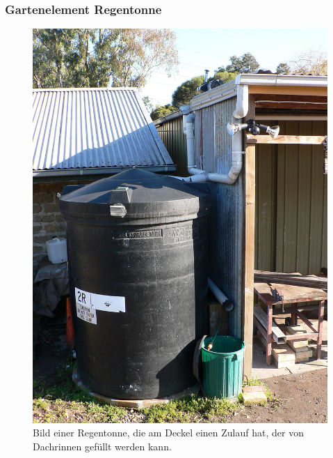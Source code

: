 \subsubsection{Gartenelement Regentonne}
\begin{figure}[!htb]
	\centering
	\includegraphics[height=0.4\textheight]{images/Regentonne.jpg}
	\caption[Bild einer Regentonne, die am Deckel einen Zulauf hat.]{
		Bild einer Regentonne, die am Deckel einen Zulauf hat, der von Dachrinnen gefüllt werden kann.\footnotemark
	}
	\label{pic:regentonne}
\end{figure}


